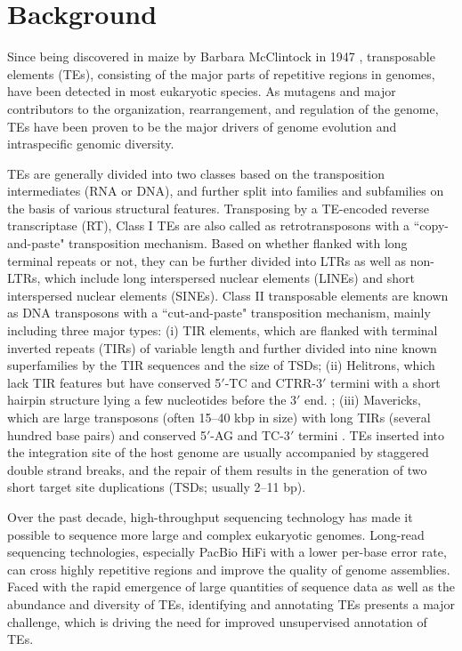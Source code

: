 \documentclass{bmcart}
\begin{document}

\section*{Background}
Since being discovered in maize by Barbara McClintock in 1947 \cite{mcclintock1947mutable, mcclintock1950origin}, transposable elements (TEs), consisting of the major parts of repetitive regions in genomes, have been detected in most eukaryotic species\cite{bourque2018ten, wells2020field}. As mutagens and major contributors to the organization, rearrangement, and regulation of the genome, TEs have been proven to be the major drivers of genome evolution and intraspecific genomic diversity\cite{quesneville2020twenty, kalendar2021mobile, kazazian2004mobile}.

TEs are generally divided into two classes based on the transposition intermediates (RNA or DNA)\cite{finnegan1989eukaryotic}, and further split into families and subfamilies on the basis of various structural features\cite{wicker2007unified}. Transposing by a TE-encoded reverse transcriptase (RT), Class I TEs are also called as retrotransposons with a ``copy-and-paste" transposition mechanism. Based on whether flanked with long terminal repeats or not, they can be further divided into LTRs as well as non-LTRs, which include long interspersed nuclear elements (LINEs) and short interspersed nuclear elements (SINEs). Class II transposable elements are known as DNA transposons with a ``cut-and-paste" transposition mechanism, mainly including three major types: (i) TIR elements, which are flanked with terminal inverted repeats (TIRs) of variable length and further divided into nine known superfamilies by the TIR sequences and the size of TSDs\cite{wicker2007unified}; (ii) Helitrons, which lack TIR features but have conserved 5$'$-TC and CTRR-3$'$ termini with a short hairpin structure lying a few nucleotides before the 3$'$ end.  \cite{kapitonov2007helitrons}; (iii) Mavericks, which are large transposons (often 15–40 kbp in size) with long TIRs (several hundred base pairs) and conserved 5$'$-AG and TC-3$'$ termini \cite{su2019tir}. TEs inserted into the integration site of the host genome are usually accompanied by staggered double strand breaks, and the repair of them results in the generation of two short target site duplications (TSDs; usually 2–11 bp)\cite{peterson2013mechanism}.

Over the past decade, high-throughput sequencing technology has made it possible to sequence more large and complex eukaryotic genomes\cite{nurk2022complete}. Long-read sequencing technologies, especially PacBio HiFi with a lower per-base error rate, can cross highly repetitive regions and improve the quality of genome assemblies\cite{yasir2022long}. Faced with the rapid emergence of large quantities of sequence data as well as the abundance and diversity of TEs, identifying and annotating TEs presents a major challenge, which is driving the need for improved unsupervised annotation of TEs.
\end{document}
